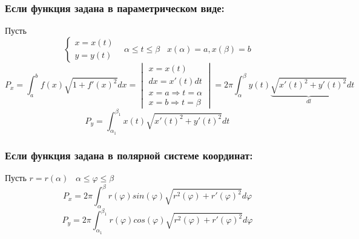 \documentclass[12pt]{article}
\begin{document}
    \subsubsection*{Если функция задана в параметрическом виде:}\noindent
    Пусть 
    \[ \begin{cases}
        x=x(t)\\
        y=y(t)
    \end{cases} \;\;\; \alpha \leq t \leq \beta \;\;\; x(\alpha)=a, x(\beta)=b \]
    \[ P_x=\int_{a}^{b}f(x)\sqrt{1+f'(x)^2}dx=\begin{vmatrix}
        x=x(t)\\
        dx=x'(t)dt\\
        x=a \Rightarrow t=\alpha\\
        x=b \Rightarrow t=\beta
    \end{vmatrix}=\boxed{2\pi \int_{\alpha}^{\beta}y(t) \underbrace{\sqrt{x'(t)^2+y'(t)^2}}_{dl}dt} \]
    \[ \boxed{P_y=\int_{\alpha_1}^{\beta_1}x(t)\sqrt{x'(t)^2+y'(t)^2}dt} \]
    \subsubsection*{Если функция задана в полярной системе координат:}\noindent
    Пусть $r=r(\alpha) \;\;\; \alpha \leq \varphi \leq \beta$
    \[ \boxed{P_x=2\pi \int_{\alpha}^{\beta}r(\varphi)sin(\varphi)\sqrt{r^2(\varphi)+r'(\varphi)^2}d\varphi} \]
    \[ \boxed{P_y=2\pi \int_{\alpha_1}^{\beta_1}r(\varphi)cos(\varphi)\sqrt{r^2(\varphi)+r'(\varphi)^2}d\varphi} \]
\end{document}
